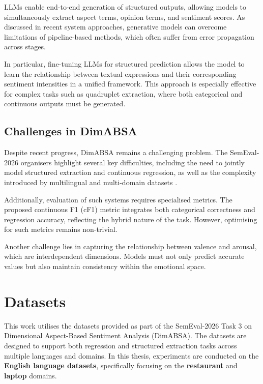 \documentclass{article}
\begin{document}
LLMs enable end-to-end generation of structured outputs, allowing models to simultaneously extract aspect terms, opinion terms, and sentiment scores. As discussed in recent system approaches, generative models can overcome limitations of pipeline-based methods, which often suffer from error propagation across stages.

In particular, fine-tuning LLMs for structured prediction allows the model to learn the relationship between textual expressions and their corresponding sentiment intensities in a unified framework. This approach is especially effective for complex tasks such as quadruplet extraction, where both categorical and continuous outputs must be generated.

\subsection{Challenges in DimABSA}

Despite recent progress, DimABSA remains a challenging problem. The SemEval-2026 organisers highlight several key difficulties, including the need to jointly model structured extraction and continuous regression, as well as the complexity introduced by multilingual and multi-domain datasets \cite{yu2026dimabsa}.

Additionally, evaluation of such systems requires specialised metrics. The proposed continuous F1 (cF1) metric integrates both categorical correctness and regression accuracy, reflecting the hybrid nature of the task. However, optimising for such metrics remains non-trivial.

Another challenge lies in capturing the relationship between valence and arousal, which are interdependent dimensions. Models must not only predict accurate values but also maintain consistency within the emotional space.

\section{Datasets}
\label{sec:datasets}

This work utilises the datasets provided as part of the SemEval-2026 Task 3 on Dimensional Aspect-Based Sentiment Analysis (DimABSA). The datasets are designed to support both regression and structured extraction tasks across multiple languages and domains. In this thesis, experiments are conducted on the \textbf{English language datasets}, specifically focusing on the \textbf{restaurant} and \textbf{laptop} domains.
\end{document}
